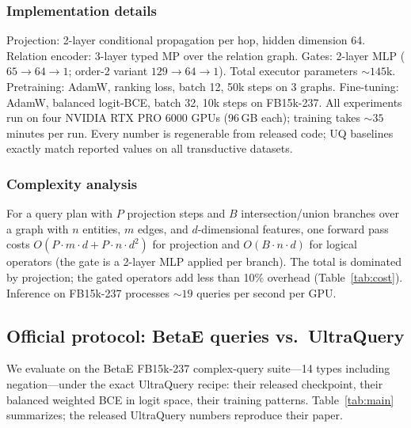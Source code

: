 \documentclass[journal]{IEEEtran}
\begin{document}
\subsubsection{Implementation details}
Projection: 2-layer conditional propagation per hop, hidden dimension
64. Relation encoder: 3-layer typed MP over the relation graph. Gates:
2-layer MLP ($65{\to}64{\to}1$; order-2 variant $129{\to}64{\to}1$).
Total executor parameters ${\sim}145$k. Pretraining: AdamW, ranking
loss, batch 12, 50k steps on 3 graphs. Fine-tuning: AdamW, balanced
logit-BCE, batch 32, 10k steps on FB15k-237. All experiments run on
four NVIDIA RTX PRO 6000 GPUs (96\,GB each); training takes
${\sim}35$ minutes per run. Every number is regenerable from released
code; UQ baselines exactly match reported values on all transductive
datasets.


\subsubsection{Complexity analysis}
For a query plan with $P$ projection steps and $B$ intersection/union
branches over a graph with $n$ entities, $m$ edges, and $d$-dimensional
features, one forward pass costs $O(P \cdot m \cdot d + P \cdot n \cdot
d^2)$ for projection and $O(B \cdot n \cdot d)$ for logical operators
(the gate is a 2-layer MLP applied per branch). The total is dominated
by projection; the gated operators add less than 10\% overhead
(Table~\ref{tab:cost}). Inference on FB15k-237 processes ${\sim}19$
queries per second per GPU.

\subsection{Official protocol: BetaE queries vs.\ UltraQuery}
\label{sec:exp-ft}

We evaluate on the BetaE FB15k-237 complex-query suite---14 types including
negation---under the exact UltraQuery recipe: their released checkpoint,
their balanced weighted BCE in logit space, their training patterns. Table~\ref{tab:main}
summarizes; the released UltraQuery numbers reproduce their paper.
\end{document}
